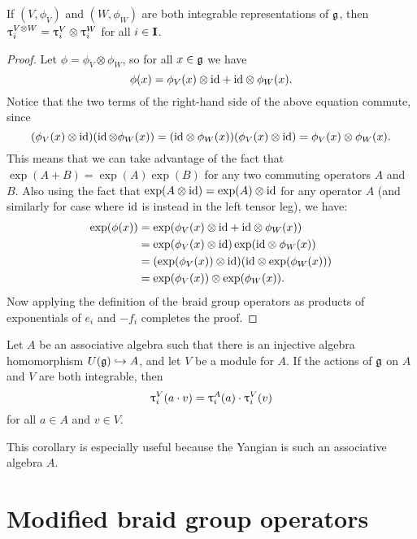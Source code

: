 \begin{proposition}\label{P:tau-tensor}
    If $(V,\phi_V)$ and $(W,\phi_W)$ are both integrable representations of $\mathfrak{g}$, then $\uptau_i^{V\otimes W} = \uptau_i^V\otimes\uptau_i^W$ for all $i\in\mathbf{I}$.
\end{proposition}
\begin{proof}
    Let $\phi=\phi_V\otimes\phi_W$, so for all $x\in\mathfrak{g}$ we have
    \[\phi(x) = \phi_V(x)\otimes{\operatorname{id}} + {\operatorname{id}}\otimes\phi_W(x).\]
    Notice that the two terms of the right-hand side of the above equation commute, since
    \[(\phi_V(x)\otimes{\operatorname{id}})(\operatorname{id}\otimes\phi_W(x)) = ({\operatorname{id}}\otimes\phi_W(x))(\phi_V(x)\otimes{\operatorname{id}}) = \phi_V(x)\otimes\phi_W(x).\]
    This means that we can take advantage of the fact that $\exp(A+B)=\exp(A)\exp(B)$ for any two commuting operators $A$ and $B$.
    Also using the fact that $\exp(A\otimes{\operatorname{id}})=\exp(A)\otimes{\operatorname{id}}$ for any operator $A$ (and similarly for case where ${\operatorname{id}}$ is instead in the left tensor leg), we have:
    \begin{align*}
        \exp(\phi(x)) &= \exp(\phi_V(x)\otimes{\operatorname{id}}+{\operatorname{id}}\otimes\phi_W(x)) \\
        &= \exp(\phi_V(x)\otimes{\operatorname{id}})\exp({\operatorname{id}}\otimes\phi_W(x)) \\
        &= (\exp(\phi_V(x))\otimes{\operatorname{id}})({\operatorname{id}}\otimes\exp(\phi_W(x))) \\
        &= \exp(\phi_V(x))\otimes\exp(\phi_W(x)).
    \end{align*}
    Now applying the definition of the braid group operators as products of exponentials of $e_i$ and $-f_i$ completes the proof.
\end{proof}

\begin{corollary}\label{C:tau-alg}
    Let $A$ be an associative algebra such that there is an injective algebra homomorphism $U(\mathfrak{g})\hookrightarrow A$, and let $V$ be a module for $A$.
    If the actions of $\mathfrak{g}$ on $A$ and $V$ are both integrable, then
    \[\uptau_i^V(a\cdot v) = \uptau_i^A(a)\cdot\uptau_i^V(v)\]
    for all $a\in A$ and $v\in V$.
\end{corollary}

This corollary is especially useful because the Yangian is such an associative algebra $A$.


\section{Modified braid group operators}\label{sec:mbraid}

